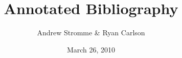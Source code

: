 \documentclass{article}
\begin{document}
\title{Annotated Bibliography}
\author{Andrew Stromme \& Ryan Carlson}
\date{March 26, 2010}
\maketitle

\nocite{*}



\end{document}
